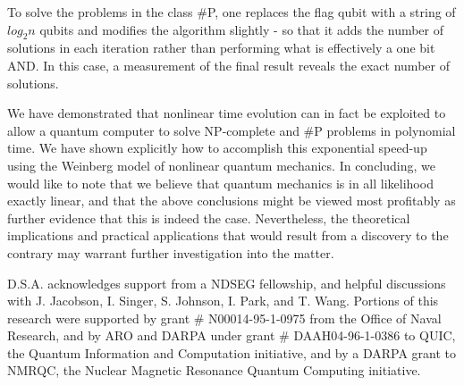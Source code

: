 \documentclass[12pt]{article}
\begin{document}
To solve the problems in the class \#P, one replaces the flag qubit with a
string of $log_{2}n$ qubits and modifies the algorithm slightly - so that it
adds the number of solutions in each iteration rather than performing what is
effectively a one bit AND. In this case, a measurement of the final result
reveals the exact number of solutions.

We have demonstrated that nonlinear time evolution can in fact be exploited to
allow a quantum computer to solve NP-complete and \#P problems in polynomial
time. We have shown explicitly how to accomplish this exponential speed-up
using the Weinberg model of nonlinear quantum mechanics. In concluding, we
would like to note that we believe that quantum mechanics is in all likelihood
exactly linear, and that the above conclusions might be viewed most profitably
as further evidence that this is indeed the case. Nevertheless, the
theoretical implications and practical applications that would result from a
discovery to the contrary may warrant further investigation into the matter.

D.S.A. acknowledges support from a NDSEG fellowship, and helpful discussions
with J. Jacobson, I. Singer, S. Johnson, I. Park, and T. Wang. Portions of
this research were supported by grant \# N00014-95-1-0975 from the Office of
Naval Research, and by ARO and DARPA under grant \# DAAH04-96-1-0386 to QUIC,
the Quantum Information and Computation initiative, and by a DARPA grant to
NMRQC, the Nuclear Magnetic Resonance Quantum Computing initiative.

\pagebreak 
\end{document}
